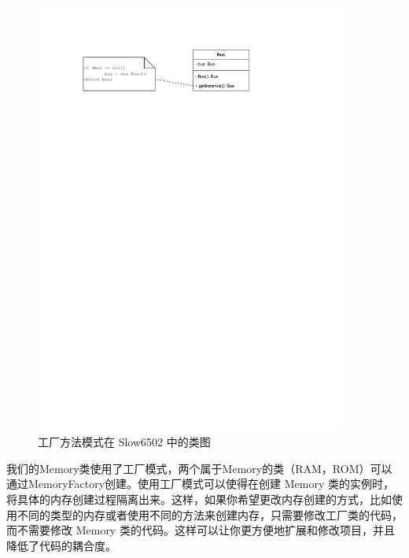 \begin{figure}[h]
  \centering
  \includegraphics[width=0.9\textwidth]{figures/单例.pdf}
  \caption{工厂方法模式在 Slow6502 中的类图}
\end{figure}

我们的Memory类使用了工厂模式，两个属于Memory的类（RAM，ROM）可以通过MemoryFactory创建。使用工厂模式可以使得在创建 Memory 类的实例时，将具体的内存创建过程隔离出来。这样，如果你希望更改内存创建的方式，比如使用不同的类型的内存或者使用不同的方法来创建内存，只需要修改工厂类的代码，而不需要修改 Memory 类的代码。这样可以让你更方便地扩展和修改项目，并且降低了代码的耦合度。

